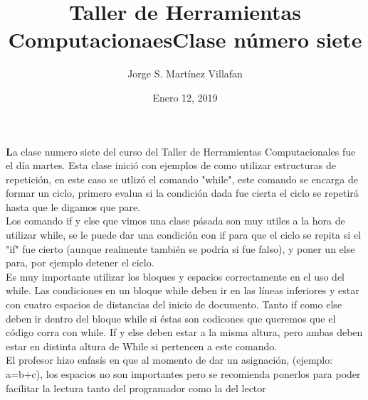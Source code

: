 \documentclass[letterpaper, 12pt, oneside]{article}%
\title{\Huge Taller de Herramientas Computacionaes}
\author{Jorge S. Martínez Villafan}
\date{Enero 12, 2019}
\begin{document}
\maketitle
\newpage
\title{Clase número siete}

\textbf La clase numero siete del curso del Taller de Herramientas Computacionales fue el día martes.
Esta clase inició con ejemplos de como utilizar estructuras de repetición, en este caso se utlizó el comando "while", este comando se encarga de formar un ciclo, primero evalua si la condición dada fue cierta el ciclo se repetirá hasta que le digamos que pare. \\
Los comando if y else que vimos una clase pásada son muy utiles a la hora de utilizar while, se le puede dar una condición con if para que el ciclo se repita si el "if" fue cierto (aunque realmente también se podría si fue falso), y poner un else para, por ejemplo detener el ciclo. \\
Es muy importante utilizar los bloques y espacios correctamente en el uso del while. Las condiciones en un bloque while deben ir en las líneas inferiores y estar con cuatro espacios de distancias del inicio de documento. Tanto if como else deben ir dentro del bloque while si éstas son codicones que queremos que el código corra con while. If y else deben estar a la misma altura, pero ambas deben estar en distinta altura de While si pertencen a este comando. \\
El profesor hizo enfasís en que al momento de dar un asignación, (ejemplo: a=b+c), los espacios no son importantes pero se recomienda ponerlos para poder facilitar la lectura tanto del programador como la del lector\\
\end{document}
